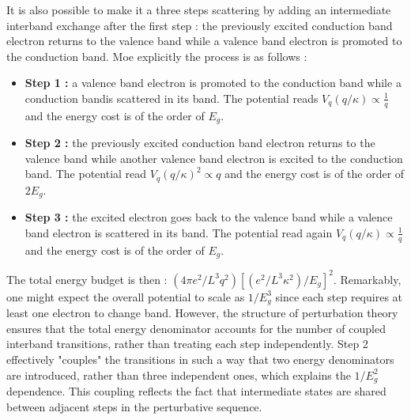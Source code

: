 \bigskip
It is also possible to make it a three steps scattering by adding an intermediate interband exchange after the first step : the previously excited conduction band electron returns to the valence band while a valence band electron is promoted to the conduction band. 
Moe explicitly the process is as follows : 

\begin{itemize}
    \item \textbf{Step 1 :} a valence band electron is promoted to the conduction band while a conduction bandis scattered in its band. The potential reads $V_q(q/\kappa) \propto \frac{1}{q}$ and the energy cost is of the order of $E_g$.
    \item \textbf{Step 2 :} the previously excited conduction band electron returns to the valence band while another valence band electron is excited to the conduction band. The potential read $V_q(q/\kappa)^2 \propto q$ and the energy cost is of the order of $2E_g$.
    \item \textbf{Step 3 :} the excited electron goes back to the valence band while a valence band electron is scattered in its band. The potential read again $V_q(q/\kappa) \propto \frac{1}{q}$ and the energy cost is of the order of $E_g$.
\end{itemize}

\noindent The total energy budget is then : $\left( 4\pi e^2/L^3q^2 \right)\left[ (e^2/L^3\kappa^2)/E_{g}\right]^2$. Remarkably, one might expect the overall potential to scale as $1/E_g^3$  since each step requires at least one electron to change band. However, the structure of perturbation theory ensures that the total energy denominator accounts for the number of coupled interband transitions, rather than treating each step independently. 
Step 2 effectively "couples" the transitions in such a way that two energy denominators are introduced, rather than three independent ones, which explains the 
$1/E_g^2$ dependence. This coupling reflects the fact that intermediate states are shared between adjacent steps in the perturbative sequence.
\bigskip 


